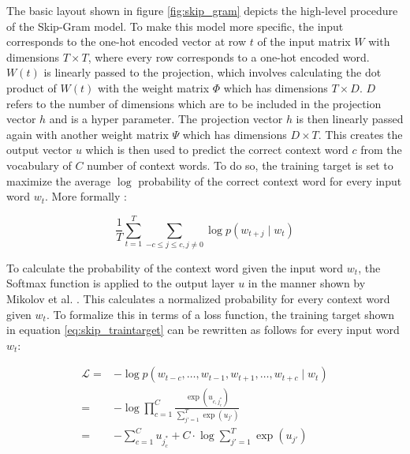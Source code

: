 	\noindent The basic layout shown in figure \ref{fig:skip_gram} depicts the
	high-level procedure of the Skip-Gram model. To make this model more
	specific, the input corresponds to the one-hot encoded vector at row $t$ of
	the input matrix $W$ with dimensions $T \times T$, where every row 
	corresponds to a one-hot encoded word. $W(t)$ is linearly passed to the
	projection, which involves calculating the dot product of $W(t)$ with the 
	weight matrix $\Phi$ which has dimensions $T \times D$. $D$ refers to the
	number of dimensions which are to be included in the projection vector $h$ 
	and is a hyper parameter. The projection vector $h$ is then linearly passed
	again with another weight matrix $\Psi$ which has dimensions $D \times T$.
	This creates the output vector $u$ which is then used to predict the correct
	context word $c$ from the vocabulary of $C$ number of context words. To do 
	so, the training target is set to maximize the average $\log$ probability 
	of the correct context word for every input word $w_{t}$. More formally 
	\citep[p. 2]{mikolov2013distributed}:

	\begin{equation}
		\frac{1}{T}\sum_{t=1}^{T}\sum_{-c \leqslant j \leqslant c,j\neq0}\log
		p(w_{t+j}\mid w_{t})
		\label{eq:skip_traintarget}
	\end{equation}

	\noindent To calculate the probability of the context word given the input
	word $w_{t}$, the Softmax function is applied to the output layer $u$ in the 
	manner shown by Mikolov et al. \citeyearpar[p. 3]{mikolov2013distributed}. 
	This calculates a normalized probability for every context word given $w_{t}$. To 
	formalize this in terms of a loss function, the training target shown in 
	equation \ref{eq:skip_traintarget} can be rewritten as follows for every
	input word $w_{t}$:

	\begin{equation}
		\begin{split}
		\mathcal{L} =& - \log p(w_{t-c},\dots,w_{t-1},w_{t+1},\dots,w_{t+c}\mid w_{t})\\
			=& - \log \prod_{c=1}^{C}\frac{\exp(u_{c,j_{c}^{*}})}{\sum_{j'=1}^{T}
			\exp(u_{j'})}\\
			=&	- \sum_{c=1}^{C} u_{j_{c}^{*}} + C \cdot \log
								\sum_{j'=1}^{T} \exp(u_{j'})
		\label{eq:deepwalk_loss}
	\end{split}
	\end{equation}

